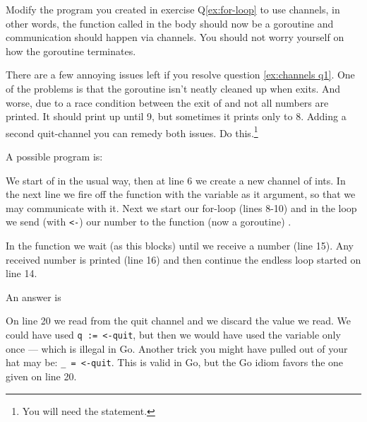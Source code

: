 \begin{Exercise}[title={Channels},difficulty=4]
\label{ex:channels}
\Question\label{ex:channels q1} Modify the program you created in
exercise Q\ref{ex:for-loop}
to use channels, in other words, the function called in the body
should now be a goroutine and communication should happen via
channels. You should not worry yourself on how the goroutine
terminates.

\Question\label{ex:channels q2} There are a few annoying issues left if
you resolve question \ref{ex:channels q1}. One of the problems is
that the goroutine isn't neatly cleaned up when 
exits. And worse, due to a race condition between the exit of 
 and  not all numbers are printed.
It should print up until 9, but sometimes it prints only to 8. Adding
a second quit-channel you can remedy both issues. Do this.\footnote{You
will need the  statement.}

\end{Exercise}

\begin{Answer}
\Question A possible program is: 

We start of in the usual way, then at line 6 we create a new channel of
ints. In the next line we fire off the function  with
the  variable as it argument, so that we may communicate with
it. Next we start our for-loop (lines 8-10) and in the loop
we send (with \lstinline{<-}) our number to the function (now a goroutine) .

In the function  we wait (as this blocks) until we receive a number (line
15). Any received number is printed (line 16) and then continue the endless loop
started on line 14.

\Question An answer is

On line 20 we read from the quit channel and we discard the value we
read. We could have used \lstinline{q := <-quit}, but then we would have used
the variable only once --- which is illegal in Go. Another trick you
might have pulled out of your hat may be: \lstinline{_ = <-quit}. This is
valid in Go, but the Go idiom favors the one given on line 20.
\end{Answer}
